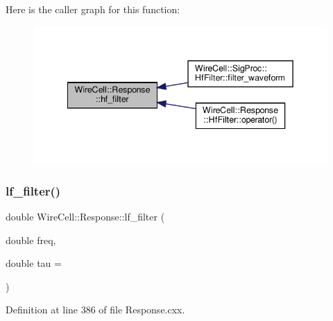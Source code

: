 Here is the caller graph for this function\+:
\nopagebreak
\begin{figure}[H]
\begin{center}
\leavevmode
\includegraphics[width=342pt]{namespace_wire_cell_1_1_response_a1a0252a5992f6d7cf76f5b1b0adcf544_icgraph}
\end{center}
\end{figure}
\mbox{\label{namespace_wire_cell_1_1_response_af61a79565c364b71935a42d74ddd3831}} 
\subsubsection{\texorpdfstring{lf\+\_\+filter()}{lf\_filter()}}
{\footnotesize\ttfamily double Wire\+Cell\+::\+Response\+::lf\+\_\+filter (\begin{DoxyParamCaption}\item[{double}]{freq,  }\item[{double}]{tau = {} }\end{DoxyParamCaption})}



Definition at line 386 of file Response.\+cxx.

